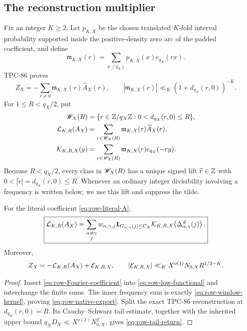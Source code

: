 \subsection{The reconstruction multiplier}

Fix an integer \(K\ge2\).  Let \(p_{K,X}\) be the chosen translated
\(K\)-fold interval probability supported inside the positive-density
zero arc of the padded coefficient, and define
\begin{equation}
 \mathfrak m_{K,X}(r)
 =
 \sum_{x\; (q_X)}p_{K,X}(x)e_{q_X}(rx).
\label{eq:row-filter-multiplier}
\end{equation}
TPC-86 proves
\[
 Z_X=-\sum_{r\ne0}\mathfrak m_{K,X}(r)\widehat A_X(r),
\qquad
 |\mathfrak m_{K,X}(r)|
 \ll_K(1+d_{q_X}(r,0))^{-K}.
\]
For \(1\le R<q_X/2\), put
\begin{align}
 \mathscr W_X(R)
 &=
 \{r\in\mathbb Z/q_X\mathbb Z:0<d_{q_X}(r,0)\le R\},
\label{eq:row-window-set}\\
 \mathcal L_{K,R}(A_X)
 &=
 \sum_{r\in\mathscr W_X(R)}
 \mathfrak m_{K,X}(r)\widehat A_X(r),
\label{eq:row-low-functional}\\
 \mathcal K_{K,R,X}(y)
 &=
 \sum_{r\in\mathscr W_X(R)}
 \mathfrak m_{K,X}(r)e_{q_X}(-ry).
\label{eq:row-window-kernel}
\end{align}
Because \(R<q_X/2\), every class in \(\mathscr W_X(R)\) has a unique
signed lift \(\widetilde r\in\mathbb Z\) with
\(0<|\widetilde r|=d_{q_X}(r,0)\le R\).  Whenever an ordinary
integer divisibility involving a frequency is written below, we use
this lift and suppress the tilde.

\begin{theorem}
\label{thm:row-native-export}
For the literal coefficient \eqref{eq:row-literal-A},
\begin{equation}
 \boxed{
 \mathcal L_{K,R}(A_X)
 =
 \sum_{\substack{\alpha\ne\gamma\\j}}
 w_{\alpha,\gamma,j}
 \mathbf 1_{G_{\alpha,\gamma}(j)\le C_X}
 \mathcal K_{K,R,X}\!\left(
 \Delta^\#_{\alpha,\gamma}(j)\right).}
\label{eq:row-native-export}
\end{equation}
Moreover,
\begin{equation}
 Z_X=-\mathcal L_{K,R}(A_X)+\mathcal E_{K,R,X},
\qquad
 |\mathcal E_{K,R,X}|
 \ll_K X^{o(1)}N_{0,X}R^{1/2-K}.
\label{eq:row-tail-return}
\end{equation}
\end{theorem}

\begin{proof}
Insert \eqref{eq:row-Fourier-coefficient} into
\eqref{eq:row-low-functional} and interchange the finite sums.  The
inner frequency sum is exactly \eqref{eq:row-window-kernel}, proving
\eqref{eq:row-native-export}.  Split the exact TPC-86 reconstruction
at \(d_{q_X}(r,0)=R\).  Its Cauchy--Schwarz tail estimate, together
with the inherited upper bound
\(q_XD_X\ll X^{o(1)}N_{0,X}^2\), gives
\eqref{eq:row-tail-return}.
\end{proof}

